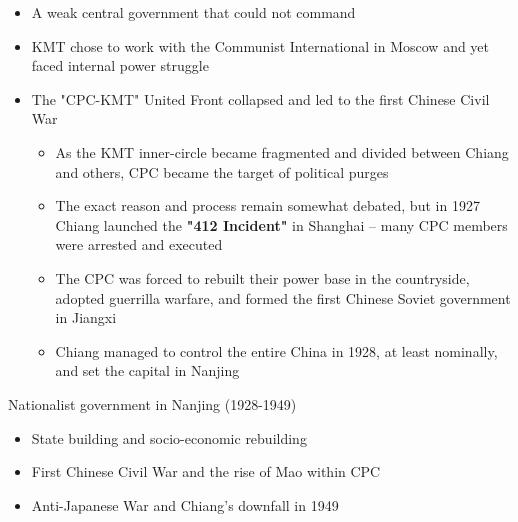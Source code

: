 \documentclass[
  10pt,
  ignorenonframetext,
]{beamer}
\begin{document}
\begin{frame}
\begin{itemize}
\small
  \item A weak central government that could not command
  \vspace{0.4cm}
  \item KMT chose to work with the Communist International in Moscow and yet faced internal power struggle
  \vspace{0.4cm}
  \item The "CPC-KMT" United Front collapsed and led to the first Chinese Civil War
  \vspace{0.1cm}
  \begin{itemize}
    \item As the KMT inner-circle became fragmented and divided between Chiang and others, CPC became the target of political purges
    \item The exact reason and process remain somewhat debated, but in 1927 Chiang launched the \textbf{"412 Incident"} in Shanghai -- many CPC members were arrested and executed
    \item The CPC was forced to rebuilt their power base in the countryside, adopted guerrilla warfare, and formed the first Chinese Soviet government in {Jiangxi}
    \item Chiang managed to control the entire China in 1928, at least nominally, and set the capital in {Nanjing}
  \end{itemize}
\end{itemize}
\end{frame}

\begin{frame}{Nationalist government in Nanjing (1928-1949)}
\label{nationalist-government-in-nanjing-1928-1949}
\begin{itemize}
  \item State building and socio-economic rebuilding
  \vspace{1cm}
  \item First Chinese Civil War and the rise of Mao within CPC
  \vspace{1cm}
  \item Anti-Japanese War and Chiang's downfall in 1949
\end{itemize}
\end{frame}
\end{document}
